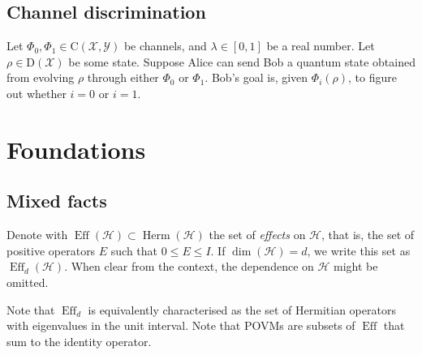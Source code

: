 \documentclass[a4paper]{report}
\newcommand{\on}[1]{\operatorname{#1}}
\newcommand{\calH}{{\mathcal{H}}}
\newcommand{\calY}{{\mathcal{Y}}}
\newcommand{\calX}{{\mathcal{X}}}
\newcommand{\rmC}{{\mathrm{C}}}
\newcommand{\rmD}{{\mathrm{D}}}
\DeclareMathOperator{\Herm}{Herm}
\begin{document}
\section{Channel discrimination}

Let $\Phi_0,\Phi_1\in\rmC(\calX,\calY)$ be channels, and $\lambda\in[0,1]$ be a real number. Let $\rho\in\rmD(\calX)$ be some state.
Suppose Alice can send Bob a quantum state obtained from evolving $\rho$ through either $\Phi_0$ or $\Phi_1$.
Bob's goal is, given $\Phi_i(\rho)$, to figure out whether $i=0$ or $i=1$.



\chapter{Foundations}

\section{Mixed facts}

\begin{defn}[Effects]
	Denote with $\on{Eff}(\calH)\subset\Herm(\calH)$ the set of \emph{effects} on $\calH$, that is, the set of positive operators $E$ such that $0\le E \le I$. If $\dim(\calH)=d$, we write this set as $\on{Eff}_d(\calH)$. When clear from the context, the dependence on $\calH$ might be omitted.
\end{defn}
Note that $\on{Eff}_d$ is equivalently characterised as the set of Hermitian operators with eigenvalues in the unit interval.
Note that POVMs are subsets of $\on{Eff}$ that sum to the identity operator.
\end{document}
